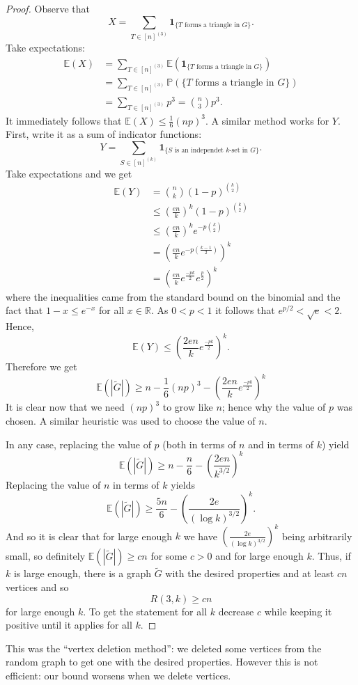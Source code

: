 \documentclass{report}
\theoremstyle{definition}
\theoremstyle{plain}
\theoremstyle{definition}
\begin{document}
\begin{proof}
		Observe that
		\[
			X = \sum_{T \in [n]^{(3)}}\mathbf{1}_{\{T\text{ forms a triangle in } G\}}.
		\]	
		Take expectations:
		\begin{align*}
			\mathbb{E}(X) &= \sum_{T \in [n]^{(3)}}\mathbb{E}(\mathbf{1}_{\{T\text{ forms a triangle in } G\}})\\
			&= \sum_{T \in [n]^{(3)}}\mathbb{P}(\{T\text{ forms a triangle in } G\})\\
			&= \sum_{T \in [n]^{(3)}} p^3 = \binom{n}{3}p^3.
		\end{align*}
		It immediately follows that $\mathbb{E}(X) \leq \frac{1}{6}(np)^3$. A similar method works for $Y$. First, write it as a sum of indicator functions:
		\[
			Y = \sum_{S \in [n]^{(k)}}\mathbf{1}_{\{S\text{ is an independet $k$-set in } G\}}.
		\]
		Take expectations and we get
		\begin{align*}
			\mathbb{E}(Y) &= \binom{n}{k}(1-p)^{\binom{k}{2}}\\
			&\leq \left(\frac{en}{k}\right)^k (1-p)^{\binom{k}{2}}\\
			&\leq \left(\frac{en}{k}\right)^k e^{-p\binom{k}{2}}\\
			&= \left(\frac{en}{k}e^{-p\left(\frac{k-1}{2}\right)}\right)^k\\
			&= \left(\frac{en}{k}e^{\frac{-pk}{2}}e^{\frac{p}{2}}\right)^k
		\end{align*}
		where the inequalities came from the standard bound on the binomial and the fact that $1-x \leq e^{-x}$ for all $x\in\mathbb{R}$. As $0< p < 1$  it follows that $e^{p/2} < \sqrt{e} < 2$. Hence,
		\[
			\mathbb{E}(Y) \leq \left(\frac{2en}{k}e^{\frac{-pk}{2}}\right)^k.
		\]
		Therefore we get
		\[
			\mathbb{E}(|\tilde{G}|) \geq n - \frac{1}{6}(np)^3 - \left(\frac{2en}{k}e^{\frac{-pk}{2}}\right)^k
		\]
		It is clear now that we need $(np)^3$ to grow like $n$; hence why the value of $p$ was chosen. A similar heuristic was used to choose the value of $n$. 
		
		In any case, replacing the value of $p$ (both in terms of $n$ and in terms of $k$) yield
		\[
			\mathbb{E}(|\tilde{G}|) \geq n - \frac{n}{6} - \left(\frac{2en}{k^{3/2}}\right)^k
		\]
		Replacing the value of $n$ in terms of $k$ yields
		\[
			\mathbb{E}(|\tilde{G}|) \geq \frac{5n}{6} - \left(\frac{2e}{(\log k)^{3/2}}\right)^k.
		\]
		And so it is clear that for large enough $k$ we have $\left(\frac{2e}{(\log k)^{3/2}}\right)^k$ being arbitrarily small, so definitely $\mathbb{E}(|\tilde{G}|) \geq cn$ for some $c>0$ and for large enough $k$. Thus, if $k$ is large enough, there is a graph $\tilde{G}$ with the desired properties and at least $cn$ vertices and so
		\[
			R(3,k) \geq cn
		\]
		for large enough $k$. To get the statement for all $k$ decrease $c$ while keeping it positive until it applies for all $k$.
	\end{proof}
	This was the ``vertex deletion method'': we deleted some vertices from the random graph to get one with the desired properties. However this is not efficient: our bound worsens when we delete vertices.
	
\end{document}
